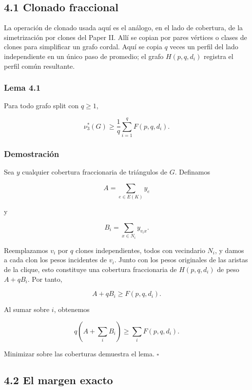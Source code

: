 \documentclass[
  11pt,
]{article}
\begin{document}
\subsection{4.1 Clonado fraccional}\label{clonado-fraccional}

La operación de clonado usada aquí es el análogo, en el lado de
cobertura, de la simetrización por clones del Paper II. Allí se copian
por pares vértices o clases de clones para simplificar un grafo cordal.
Aquí se copia \(q\) veces un perfil del lado independiente en un único
paso de promedio; el grafo \(H(p,q,d_i)\) registra el perfil común
resultante.

\subsubsection{Lema 4.1}\label{lema-4.1-cota-de-clonado-fraccional}

Para todo grafo split con \(q\ge1\),

\[
\boxed{
\nu_3^*(G)
\ge
\frac1q\sum_{i=1}^qF(p,q,d_i).
}
\tag{4.1}
\]

\subsubsection{Demostración}\label{demostraciuxf3n-1}

Sea \(y\) cualquier cobertura fraccionaria de triángulos de \(G\).
Definamos

\[
A=\sum_{e\in E(K)}y_e
\]

y

\[
B_i=\sum_{x\in N_i}y_{v_ix}.
\]

Reemplazamos \(v_i\) por \(q\) clones independientes, todos con
vecindario \(N_i\), y damos a cada clon los pesos incidentes de \(v_i\).
Junto con los pesos originales de las aristas de la clique, esto
constituye una cobertura fraccionaria de \(H(p,q,d_i)\) de peso
\(A+qB_i\). Por tanto,

\[
A+qB_i\ge F(p,q,d_i).
\]

Al sumar sobre \(i\), obtenemos

\[
q\left(A+\sum_iB_i\right)
\ge
\sum_iF(p,q,d_i).
\]

Minimizar sobre las coberturas demuestra el lema. \(\square\)

\subsection{4.2 El margen exacto}\label{el-margen-exacto}
\end{document}
